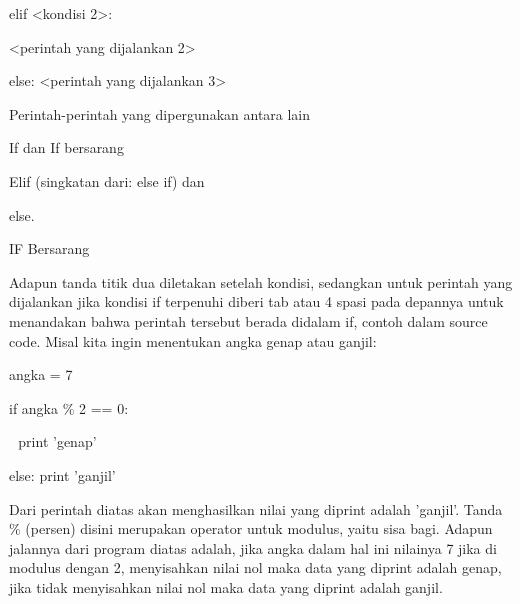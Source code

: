 \noindent 
\vspace{\baselineskip}
elif <kondisi 2>: \par
\noindent 
\vspace{\baselineskip}
<perintah yang dijalankan 2> \par
\noindent 
\vspace{\baselineskip}
else:\vspace{\baselineskip}
 $  $<perintah yang dijalankan 3> \par
\noindent 
\vspace{\baselineskip}
\vspace{\baselineskip}
Perintah-perintah yang dipergunakan antara lain \par
\noindent 
\vspace{\baselineskip}
If dan If bersarang \par
\noindent 
\vspace{\baselineskip}
Elif (singkatan dari: else if) dan \par
\noindent 
\vspace{\baselineskip}
else.\vspace{\baselineskip}
 \par
\noindent 
\vspace{\baselineskip}
IF Bersarang \par
\noindent 
\vspace{\baselineskip}
Adapun tanda titik dua diletakan setelah kondisi, sedangkan untuk perintah yang dijalankan jika kondisi if terpenuhi diberi tab atau 4 spasi pada depannya untuk menandakan bahwa perintah tersebut berada didalam if, contoh dalam source code. Misal kita ingin menentukan angka genap atau ganjil: \par
\noindent 
\vspace{\baselineskip}
angka = 7 \par
\noindent 
\vspace{\baselineskip}
if angka  $  \%  $ 2 == 0: \par
\noindent 
\vspace{\baselineskip}
 $  $  $  $ print 'genap' \par
\noindent 
\vspace{\baselineskip}
else:\vspace{\baselineskip}
 $  $print 'ganjil' \par
\noindent 
\vspace{\baselineskip}
 Dari perintah diatas akan menghasilkan nilai yang diprint adalah 'ganjil'. Tanda  $  \%  $ (persen) disini merupakan operator untuk modulus, yaitu sisa bagi. Adapun jalannya dari program diatas adalah, jika angka dalam hal ini nilainya 7 jika di modulus dengan 2, menyisahkan nilai nol maka data yang diprint adalah genap, jika tidak menyisahkan nilai nol maka data yang diprint adalah ganjil. \par
